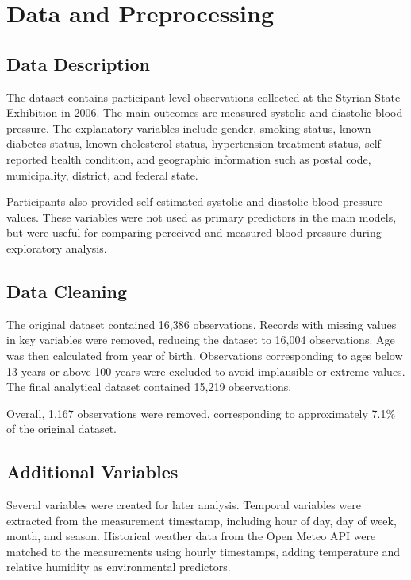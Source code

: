 \documentclass[12pt,a4paper]{article}
\begin{document}
\section{Data and Preprocessing}

\subsection{Data Description}

The dataset contains participant level observations collected at the Styrian State Exhibition in 2006. The main outcomes are measured systolic and diastolic blood pressure. The explanatory variables include gender, smoking status, known diabetes status, known cholesterol status, hypertension treatment status, self reported health condition, and geographic information such as postal code, municipality, district, and federal state.

Participants also provided self estimated systolic and diastolic blood pressure values. These variables were not used as primary predictors in the main models, but were useful for comparing perceived and measured blood pressure during exploratory analysis.

\subsection{Data Cleaning}

The original dataset contained 16,386 observations. Records with missing values in key variables were removed, reducing the dataset to 16,004 observations. Age was then calculated from year of birth. Observations corresponding to ages below 13 years or above 100 years were excluded to avoid implausible or extreme values. The final analytical dataset contained 15,219 observations.

Overall, 1,167 observations were removed, corresponding to approximately 7.1\% of the original dataset.

\subsection{Additional Variables}

Several variables were created for later analysis. Temporal variables were extracted from the measurement timestamp, including hour of day, day of week, month, and season. Historical weather data from the Open Meteo API were matched to the measurements using hourly timestamps, adding temperature and relative humidity as environmental predictors.
\end{document}

